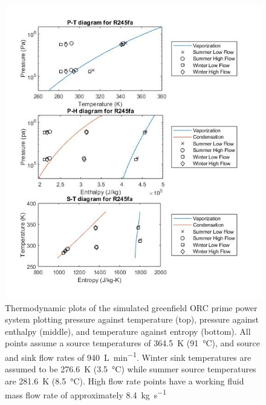 \begin{figure}[h]
	\centering

	\includegraphics[width=\textwidth]{figures/GreenfieldThermoPlots}
	\caption{Thermodynamic plots of the simulated greenfield ORC prime power system plotting pressure against temperature (top), pressure against enthalpy (middle), and temperature against entropy (bottom). All points assume a source temperatures of \SI{364.5}{\kelvin} (\SI{91}{\degreeCelsius}), and source and sink flow rates of \SI{940}{\liter\per\minute}. Winter sink temperatures are assumed to be \SI{276.6}{\kelvin} (\SI{3.5}{\degreeCelsius}) while summer source temperatures are \SI{281.6}{\kelvin} (\SI{8.5}{\degreeCelsius}). High flow rate points have a working fluid mass flow rate of approximately \SI{8.4}{\kilogram\per\second}}
\label{fig:gf_themoplots}
\end{figure}